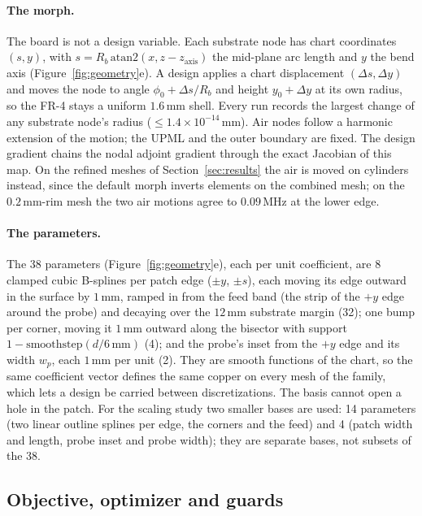 \documentclass{anvil-paper}
\begin{document}
\paragraph{The morph.}
The board is not a design variable. Each substrate node has chart
coordinates $(s, y)$, with $s = R_b\,\mathrm{atan2}(x, z - z_{\mathrm{axis}})$
the mid-plane arc length and $y$ the bend axis (Figure~\ref{fig:geometry}e). A design applies a chart
displacement $(\Delta s, \Delta y)$ and moves the node to angle
$\phi_0 + \Delta s/R_b$ and height $y_0 + \Delta y$ at its own radius, so
the FR-4 stays a uniform $1.6$\,mm shell. Every run records the largest
change of any substrate node's radius ($\le 1.4\times10^{-14}$\,mm). Air
nodes follow a harmonic extension of the motion; the UPML and the outer
boundary are fixed. The design gradient chains the nodal adjoint gradient
through the exact Jacobian of this map. On the refined meshes of
Section~\ref{sec:results} the air is moved on cylinders instead, since the
default morph inverts elements on the combined mesh; on the $0.2$\,mm-rim
mesh the two air motions agree to $0.09$\,MHz at the lower edge.

\paragraph{The parameters.}
The 38 parameters (Figure~\ref{fig:geometry}e), each per unit coefficient, are $8$ clamped cubic
B-splines per patch edge ($\pm y$, $\pm s$), each moving its edge outward in
the surface by $1$\,mm, ramped in from the feed band (the strip of the $+y$
edge around the probe) and decaying over the
$12$\,mm substrate margin (32); one bump per corner, moving it $1$\,mm
outward along the bisector with support $1 - \mathrm{smoothstep}(d/6\,\mathrm{mm})$
(4); and the probe's inset from the $+y$ edge and its width $w_p$, each
$1$\,mm per unit (2). They
are smooth functions of the chart, so the same coefficient vector defines
the same copper on every mesh of the family, which lets a design be carried
between discretizations. The basis cannot open a hole in the patch. For the
scaling study two smaller bases are used: 14 parameters (two linear outline
splines per edge, the corners and the feed) and 4 (patch width and length,
probe inset and probe width); they are separate bases, not subsets of the
38.

\subsection{Objective, optimizer and guards}
\label{sec:objective}
\end{document}
